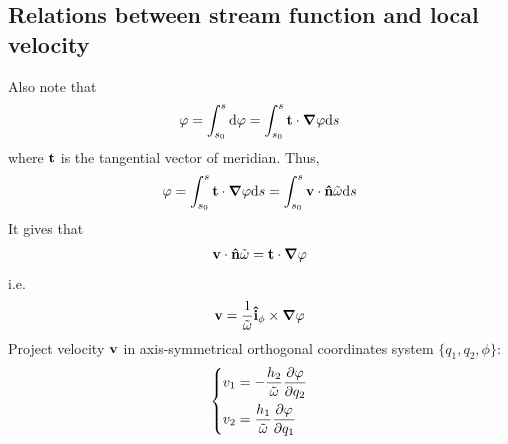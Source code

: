 \documentclass[fontsize=11pt, %
                             paper=a4, %
                             twoside, %
                             captions=tableheading,
                             index=totoc,
                             hyperref]{labbook}
\begin{document}
\subsection{Relations between stream function and local velocity}
Also note that
\begin{equation}
\varphi=\int_{s_0}^s\mathrm{d}\varphi=\int_{s_0}^s\mathbf{t}\cdot \mbox{\boldmath$ \nabla $} \varphi \mathrm{d}s
\end{equation}
where $\mathbf{t}$ is the tangential vector of meridian. Thus,
\begin{equation}
\varphi=\int_{s_0}^s\mathbf{t}\cdot \mbox{\boldmath$ \nabla $} \varphi \mathrm{d}s=\int_{s_0}^s\mathbf{v}\cdot \mathbf{\hat{n}}\tilde{\omega}\mathrm{d}s
\end{equation}
It gives that
\begin{equation}
\mathbf{v} \cdot \mathbf{\hat{n}}\tilde{\omega}=\mathbf{t} \cdot \mbox{\boldmath$ \nabla $} \varphi
\end{equation}
i.e.
\begin{equation}
\mathbf{v}=\frac{1}{\tilde{\omega}}\mathbf{\hat{i}}_{\phi}\times\mbox{\boldmath$ \nabla $} \varphi
\end{equation}
Project velocity $\mathbf{v}$ in axis-symmetrical orthogonal coordinates system $\{q_1,q_2,\phi\}$:
\begin{equation}\label{eqn_velocity}
\left\{
\begin{aligned}
v_1&=-\frac{h_2}{\tilde{\omega}}\frac{\partial \varphi}{\partial q_2}\\
v_2&=\frac{h_1}{\tilde{\omega}}\frac{\partial \varphi}{\partial q_1}
\end{aligned}
\right.
\end{equation}
\end{document}
